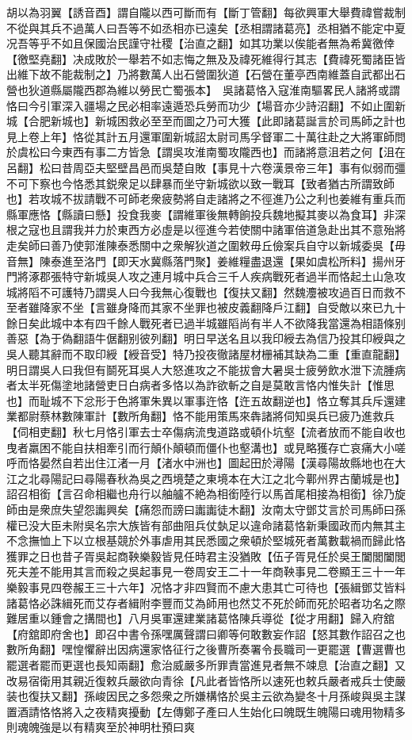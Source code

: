 胡以為羽翼【誘音酉】謂自隴以西可斷而有【斷丁管翻】每欲興軍大舉費禕嘗裁制不從與其兵不過萬人曰吾等不如丞相亦已遠矣【丞相謂諸葛亮】丞相猶不能定中夏况吾等乎不如且保國治民謹守社稷【治直之翻】如其功業以俟能者無為希冀徼倖【徼堅堯翻】决成敗於一舉若不如志悔之無及及禕死維得行其志【費禕死蜀諸臣皆出維下故不能裁制之】乃將數萬人出石營圍狄道【石營在董亭西南維蓋自武都出石營也狄道縣屬隴西郡為維以勞民亡蜀張本】　吳諸葛恪入寇淮南驅畧民人諸將或謂恪曰今引軍深入疆場之民必相率遠遁恐兵勞而功少【場音亦少詩沼翻】不如止圍新城【合肥新城也】新城困救必至至而圖之乃可大獲【此即諸葛誕言於司馬師之計也見上卷上年】恪從其計五月還軍圍新城詔太尉司馬孚督軍二十萬往赴之大將軍師問於虞松曰今東西有事二方皆急【謂吳攻淮南蜀攻隴西也】而諸將意沮若之何【沮在呂翻】松曰昔周亞夫堅壁昌邑而吳楚自敗【事見十六卷漢景帝三年】事有似弱而彊不可下察也今恪悉其鋭衆足以肆暴而坐守新城欲以致一戰耳【致者猶古所謂致師也】若攻城不拔請戰不可師老衆疲勢將自走諸將之不徑進乃公之利也姜維有重兵而縣軍應恪【縣讀曰懸】投食我麥【謂維軍後無轉餉投兵魏地擬其麥以為食耳】非深根之寇也且謂我并力於東西方必虛是以徑進今若使關中諸軍倍道急赴出其不意殆將走矣師曰善乃使郭淮陳泰悉關中之衆解狄道之圍敕毋丘儉案兵自守以新城委吳【毋音無】陳泰進至洛門【即天水冀縣落門聚】姜維糧盡退還【果如虞松所料】揚州牙門將涿郡張特守新城吳人攻之連月城中兵合三千人疾病戰死者過半而恪起土山急攻城將䧟不可護特乃謂吳人曰今我無心復戰也【復扶又翻】然魏灋被攻過百日而救不至者雖降家不坐【言雖身降而其家不坐罪也被皮義翻降戶江翻】自受敵以來已九十餘日矣此城中本有四千餘人戰死者已過半城雖䧟尚有半人不欲降我當還為相語條别善惡【為于偽翻語牛倨翻别彼列翻】明日早送名且以我印綬去為信乃投其印綬與之吳人聽其辭而不取印綬【綬音受】特乃投夜徹諸屋材栅補其缺為二重【重直龍翻】明日謂吳人曰我但有鬬死耳吳人大怒進攻之不能拔會大暑吳士疲勞飲水泄下流腫病者太半死傷塗地諸營吏日白病者多恪以為詐欲斬之自是莫敢言恪内惟失計【惟思也】而耻城不下忿形于色將軍朱異以軍事迕恪【迕五故翻逆也】恪立奪其兵斥還建業都尉蔡林數陳軍計【數所角翻】恪不能用策馬來犇諸將伺知吳兵已疲乃進救兵【伺相吏翻】秋七月恪引軍去士卒傷病流曳道路或頓仆坑壑【流者放而不能自收也曳者羸困不能自扶相牽引而行顛仆顛頓而僵仆也壑溝也】或見略獲存亡哀痛大小嗟呼而恪晏然自若出住江渚一月【渚水中洲也】圖起田於潯陽【漢尋陽故縣地也在大江之北尋陽記曰尋陽春秋為吳之西境楚之東境本在大江之北今鄿州界古蘭城是也】詔召相銜【言召命相繼也舟行以舳艫不絶為相銜陸行以馬首尾相接為相銜】徐乃旋師由是衆庶失望怨讟興矣【痛怨而謗曰讟讟徒木翻】汝南太守鄧艾言於司馬師曰孫權已没大臣未附吳名宗大族皆有部曲阻兵仗埶足以違命諸葛恪新秉國政而内無其主不念撫恤上下以立根基競於外事虐用其民悉國之衆頓於堅城死者萬數載禍而歸此恪獲罪之日也昔子胥吳起商鞅樂毅皆見任時君主没猶敗【伍子胥見任於吳王闔閭闔閭死夫差不能用其言而殺之吳起事見一卷周安王二十一年商鞅事見二卷顯王三十一年樂毅事見四卷赧王三十六年】况恪才非四賢而不慮大患其亡可待也【張緝鄧艾皆料諸葛恪必誅緝死而艾存者緝附李豐而艾為師用也然艾不死於師而死於昭者功名之際難居重以鍾會之搆間也】八月吳軍還建業諸葛恪陳兵導從【從才用翻】歸入府舘【府舘即府舍也】即召中書令孫嘿厲聲謂曰卿等何敢數妄作詔【怒其數作詔召之也數所角翻】嘿惶懼辭出因病還家恪征行之後曹所奏署令長職司一更罷選【曹選曹也罷選者罷而更選也長知兩翻】愈治威嚴多所罪責當進見者無不竦息【治直之翻】又改易宿衛用其親近復敕兵嚴欲向青徐【凡此者皆恪所以速死也敕兵嚴者戒兵士使嚴装也復扶又翻】孫峻因民之多怨衆之所嫌構恪於吳主云欲為變冬十月孫峻與吳主謀置酒請恪恪將入之夜精爽擾動【左傳鄭子產曰人生始化曰魄既生魄陽曰魂用物精多則魂魄強是以有精爽至於神明杜預曰爽